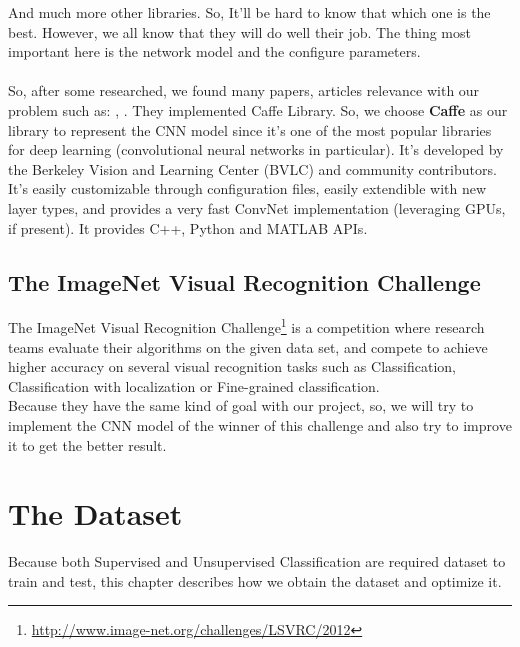 \documentclass[hidelinks,12pt,a4paper]{report}
\begin{document}
And much more other libraries. So, It’ll be hard to know that which one is the best. However, we all know that they will do well their job. The thing most important here is the network model and the configure parameters. \\
\\
So, after some researched, we found many papers, articles relevance with our problem such as: \cite{placesdatabase}, \cite{landclassification}. They implemented Caffe Library. So, we choose \textbf{Caffe} as our library to represent the CNN model since it’s one of the most popular libraries for deep learning (convolutional neural networks in particular). It's developed by the Berkeley Vision and Learning Center (BVLC) and
community contributors. It’s easily customizable through configuration files, easily extendible with new layer types,
and provides a very fast ConvNet implementation (leveraging GPUs, if present). It provides C++, Python and MATLAB APIs.

\section{The ImageNet Visual Recognition Challenge}

The ImageNet Visual Recognition Challenge\footnote{\url{http://www.image-net.org/challenges/LSVRC/2012}} is a competition where research teams evaluate their algorithms on the given data set, and compete to achieve higher accuracy on several visual recognition tasks such as Classification, Classification with localization or Fine-grained classification. \\
Because they have the same kind of goal with our project, so, we will try to implement the CNN model of the winner of this challenge and also try to improve it to get the better result.

\chapter{The Dataset}
Because both Supervised and Unsupervised Classification are required dataset to train and test, this chapter describes how we obtain the dataset and optimize it.
\end{document}
